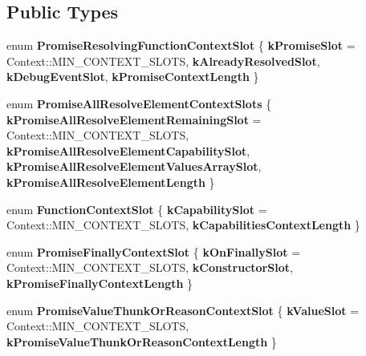 \subsection*{Public Types}
\begin{DoxyCompactItemize}
\item 
\mbox{\label{classv8_1_1internal_1_1PromiseBuiltinsAssembler_a8623affd9d4cc381a548b2bf937cd26f}} 
enum {\bfseries Promise\+Resolving\+Function\+Context\+Slot} \{ {\bfseries k\+Promise\+Slot} = Context\+:\+:M\+I\+N\+\_\+\+C\+O\+N\+T\+E\+X\+T\+\_\+\+S\+L\+O\+TS, 
{\bfseries k\+Already\+Resolved\+Slot}, 
{\bfseries k\+Debug\+Event\+Slot}, 
{\bfseries k\+Promise\+Context\+Length}
 \}
\item 
\mbox{\label{classv8_1_1internal_1_1PromiseBuiltinsAssembler_a39f734cf374704268a75581ca08deb0c}} 
enum {\bfseries Promise\+All\+Resolve\+Element\+Context\+Slots} \{ {\bfseries k\+Promise\+All\+Resolve\+Element\+Remaining\+Slot} = Context\+:\+:M\+I\+N\+\_\+\+C\+O\+N\+T\+E\+X\+T\+\_\+\+S\+L\+O\+TS, 
{\bfseries k\+Promise\+All\+Resolve\+Element\+Capability\+Slot}, 
{\bfseries k\+Promise\+All\+Resolve\+Element\+Values\+Array\+Slot}, 
{\bfseries k\+Promise\+All\+Resolve\+Element\+Length}
 \}
\item 
\mbox{\label{classv8_1_1internal_1_1PromiseBuiltinsAssembler_a2e1b921b76d99261d540cb5a28e38feb}} 
enum {\bfseries Function\+Context\+Slot} \{ {\bfseries k\+Capability\+Slot} = Context\+:\+:M\+I\+N\+\_\+\+C\+O\+N\+T\+E\+X\+T\+\_\+\+S\+L\+O\+TS, 
{\bfseries k\+Capabilities\+Context\+Length}
 \}
\item 
\mbox{\label{classv8_1_1internal_1_1PromiseBuiltinsAssembler_aa5f578a4e9a0dc7657e0d20ed32e6d20}} 
enum {\bfseries Promise\+Finally\+Context\+Slot} \{ {\bfseries k\+On\+Finally\+Slot} = Context\+:\+:M\+I\+N\+\_\+\+C\+O\+N\+T\+E\+X\+T\+\_\+\+S\+L\+O\+TS, 
{\bfseries k\+Constructor\+Slot}, 
{\bfseries k\+Promise\+Finally\+Context\+Length}
 \}
\item 
\mbox{\label{classv8_1_1internal_1_1PromiseBuiltinsAssembler_ad56720e6d76bf8328571060d8ca780f8}} 
enum {\bfseries Promise\+Value\+Thunk\+Or\+Reason\+Context\+Slot} \{ {\bfseries k\+Value\+Slot} = Context\+:\+:M\+I\+N\+\_\+\+C\+O\+N\+T\+E\+X\+T\+\_\+\+S\+L\+O\+TS, 
{\bfseries k\+Promise\+Value\+Thunk\+Or\+Reason\+Context\+Length}
 \}
\end{DoxyCompactItemize}
